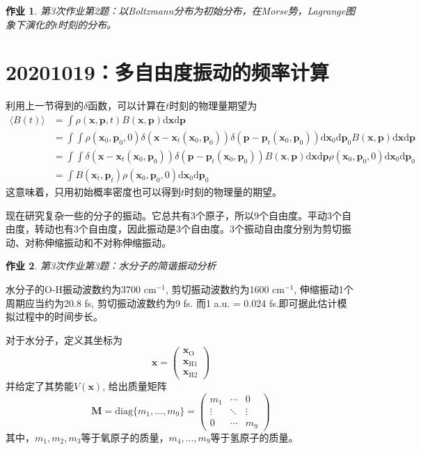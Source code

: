 \documentclass[12pt]{article}
\newtheorem{asg}{作业}
\begin{document}
    \begin{asg}
        第3次作业第2题：以Boltzmann分布为初始分布，在Morse势，Lagrange图象下演化的$t$时刻的分布。
    \end{asg}

\section{20201019：多自由度振动的频率计算}

    利用上一节得到的$\delta$函数，可以计算在$t$时刻的物理量期望为
    \begin{align*}
        \langle B(t) \rangle &= \int \rho(\bm{x},\bm{p},t) B(\bm{x},\bm{p}) \mathrm{d}\bm{x}\mathrm{d}\bm{p}\\
        &= \int \int \rho(\bm{x}_0,\bm{p}_0,0)\delta(\bm{x}-\bm{x}_t(\bm{x}_0,\bm{p}_0)) \delta(\bm{p}-\bm{p}_t(\bm{x}_0,\bm{p}_0)) \mathrm{d}\bm{x}_0\mathrm{d}\bm{p}_0 B(\bm{x},\bm{p}) \mathrm{d}\bm{x}\mathrm{d}\bm{p}\\
        &= \int \int \delta(\bm{x}-\bm{x}_t(\bm{x}_0,\bm{p}_0)) \delta(\bm{p}-\bm{p}_t(\bm{x}_0,\bm{p}_0)) B(\bm{x},\bm{p}) \mathrm{d}\bm{x}\mathrm{d}\bm{p} \rho(\bm{x}_0,\bm{p}_0,0) \mathrm{d}\bm{x}_0\mathrm{d}\bm{p}_0\\
        &= \int B(\bm{x}_t,\bm{p}_t) \rho(\bm{x}_0,\bm{p}_0,0)\mathrm{d}\bm{x}_0\mathrm{d}\bm{p}_0
    \end{align*}
    这意味着，只用初始概率密度也可以得到$t$时刻的物理量的期望。

    现在研究复杂一些的分子的振动。它总共有3个原子，所以9个自由度。平动3个自由度，转动也有3个自由度，因此振动是3个自由度。3个振动自由度分别为剪切振动、对称伸缩振动和不对称伸缩振动。
    \begin{asg}
        第3次作业第3题：水分子的简谐振动分析
    \end{asg}
    水分子的O-H振动波数约为3700 cm$^{-1}$, 剪切振动波数约为1600 cm$^{-1}$, 伸缩振动1个周期应当约为20.8 fs, 剪切振动波数约为9 fs. 而1 a.u. = 0.024 fs.即可据此估计模拟过程中的时间步长。

    对于水分子，定义其坐标为
    \begin{equation*}
        \bm{x} = 
        \begin{pmatrix}
            \bm{x}_\mathrm{O}\\
            \bm{x}_{\mathrm{H1}}\\
            \bm{x}_{\mathrm{H2}}
        \end{pmatrix}
    \end{equation*}
    并给定了其势能$V(\bm{x})$, 给出质量矩阵
    \begin{equation*}
        \bm{M} = \mathrm{diag} \{m_1,...,m_9 \} = 
        \begin{pmatrix}
            m_1 & \cdots & 0\\
            \vdots & \ddots & \vdots\\
            0 & \cdots & m_9
        \end{pmatrix}
    \end{equation*}
    其中，$m_1,m_2,m_3$等于氧原子的质量，$m_4,...,m_9$等于氢原子的质量。
\end{document}
